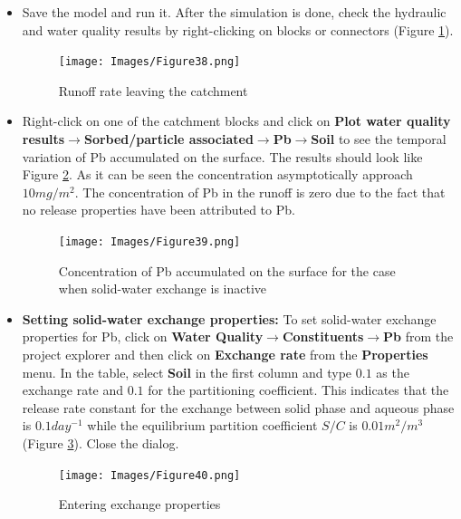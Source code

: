 \begin{itemize}
\item Save the model and run it. After the simulation is done, check the hydraulic and water quality results by right-clicking on blocks or connectors (Figure \ref{fig:38}). 
    
\begin{figure}[!ht]
\begin{center}
\texttt{[image: Images/Figure38.png]} \\
\caption{Runoff rate leaving the catchment}\label{fig:38} 
\end{center}
\end{figure}  

\item Right-click on one of the catchment blocks and click on \textbf{Plot water quality results}$\rightarrow$\textbf{Sorbed/particle associated}$\rightarrow$\textbf{Pb}$\rightarrow$\textbf{Soil} to see the temporal variation of Pb accumulated on the surface. The results should look like Figure \ref{fig:39}. As it can be seen the concentration asymptotically approach $10mg/m^2$. The concentration of Pb in the runoff is zero due to the fact that no release properties have been attributed to Pb. 

\begin{figure}[!ht]
\begin{center}
\texttt{[image: Images/Figure39.png]} \\
\caption{Concentration of Pb accumulated on the surface for the case when solid-water exchange is inactive}\label{fig:39} 
\end{center}
\end{figure} 

\item \textbf{Setting solid-water exchange properties: } To set solid-water exchange properties for Pb, click on \textbf{Water Quality}$\rightarrow$\textbf{Constituents}$\rightarrow$\textbf{Pb} from the project explorer and then click on \textbf{Exchange rate} from the \textbf{Properties} menu. In the table, select \textbf{Soil} in the first column and type $0.1$ as the exchange rate and $0.1$ for the partitioning coefficient. This indicates that the release rate constant for the exchange between solid phase and aqueous phase is $0.1day^{-1}$ while the equilibrium partition coefficient $S/C$ is $0.01m^2/m^3$ (Figure \ref{fig:40}). Close the dialog. \\ 

\begin{figure}[!ht]
\begin{center}
\texttt{[image: Images/Figure40.png]} \\
\caption{Entering exchange properties}\label{fig:40} 
\end{center}
\end{figure}


\end{itemize}
